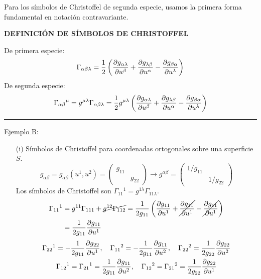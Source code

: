 Para los símbolos de Christoffel de segunda especie, usamos la primera forma fundamental en notación contravariante.
\begin{mybox}
    \begin{center}
        \textbf{DEFINICIÓN DE SÍMBOLOS DE CHRISTOFFEL}
    \end{center}
    De primera especie:
    $$
    \Gamma _{\alpha \beta \lambda }=\frac{1}{2}\left ( \pdv{g_{\alpha \lambda  }}{u^\beta }+\pdv{g_{\lambda \beta }}{u^\alpha }-\pdv{g_{\beta \alpha }}{u^\lambda } \right )
    $$
    De segunda especie:
    $$
    \Gamma _{\alpha \beta }{}^\mu =g^{\mu \lambda }\Gamma _{\alpha \beta \lambda }=\frac{1}{2}g^{\mu \lambda }\left ( \pdv{g_{\alpha \lambda  }}{u^\beta }+\pdv{g_{\lambda \beta }}{u^\alpha }-\pdv{g_{\beta \alpha }}{u^\lambda } \right )
    $$
    \noindent\rule{\textwidth}{0.5pt}
    \underline{Ejemplo B:}
    \begin{enumerate}
        \item[(i)] Símbolos de Christoffel para coordenadas ortogonales sobre una superficie $S$.
        $$
        g_{\alpha \beta }=g_{\alpha \beta }(u^1,u^2)=\left ( \begin{array}{cc}
             g_{11}&  \\
             & g_{22}
        \end{array} \right )\rightarrow g^{\alpha \beta }=\left ( \begin{array}{cc}
             1/g_{11}&  \\
             & 1/g_{22}
        \end{array} \right )
        $$
        Los símbolos de Christoffel son $\Gamma _{11}{}^1=g^{1\lambda }\Gamma _{11\lambda }$.
        \begin{equation*}
            \begin{split}
                \Gamma _{11}{}^1&=g^{11}\Gamma_{111}+\cancel{g^{12}\Gamma _{112}}=\frac{1}{2g_{11}}\left ( \pdv{g_{11}}{u^1}+\cancel{\pdv{g_{11}}{u^1}}-\cancel{\pdv{g_{11}}{u^1}} \right )\\
                &=\frac{1}{2g_{11}}\pdv{g_{11}}{u^1}(u^1,u^2)
            \end{split}
        \end{equation*}
        \begin{gather*}
            \Gamma _{22}{}^1=-\frac{1}{2g_{11}}\pdv{g_{22}}{u^1} ,\quad \Gamma_{11}{}^2=-\frac{1}{2g_{11}}\pdv{g_{11}}{u^2} ,\quad \Gamma_{22}{}^2=\frac{1}{2g_{22}}\pdv{g_{22}}{u^2} \\
            \Gamma_{12}{}^1=\Gamma_{21}{}^1=\frac{1}{2g_{11}}\pdv{g_{11}}{u^2},\quad \Gamma_{12}{}^2=\Gamma_{21}{}^2=\frac{1}{2g_{22}}\pdv{g_{22}}{u^1}
        \end{gather*}


\end{enumerate}
\end{mybox}
